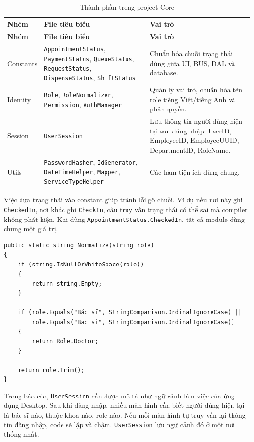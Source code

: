 \documentclass[12pt,a4paper]{article}
\numberwithin{figure}{subsection}
\numberwithin{table}{subsection}
\newcounter{codecounter}
\newenvironment{codeblock}[2]{%
    \refstepcounter{codecounter}%
    \phantomsection%
    \label{#1}%
    \par\smallskip
}{%
    \par\smallskip
}
\begin{document}
\begin{longtable}{|p{4cm}|p{4.8cm}|p{5cm}|}
\caption{Thành phần trong project Core} \\
\hline
\textbf{Nhóm} & \textbf{File tiêu biểu} & \textbf{Vai trò} \\
\hline
\endfirsthead
\hline
\textbf{Nhóm} & \textbf{File tiêu biểu} & \textbf{Vai trò} \\
\hline
\endhead
Constants & \texttt{AppointmentStatus}, \texttt{PaymentStatus}, \texttt{QueueStatus}, \texttt{RequestStatus}, \texttt{DispenseStatus}, \texttt{ShiftStatus} & Chuẩn hóa chuỗi trạng thái dùng giữa UI, BUS, DAL và database. \\
\hline
Identity & \texttt{Role}, \texttt{RoleNormalizer}, \texttt{Permission}, \texttt{AuthManager} & Quản lý vai trò, chuẩn hóa tên role tiếng Việt/tiếng Anh và phân quyền. \\
\hline
Session & \texttt{UserSession} & Lưu thông tin người dùng hiện tại sau đăng nhập: UserID, EmployeeID, EmployeeUUID, DepartmentID, RoleName. \\
\hline
Utils & \texttt{PasswordHasher}, \texttt{IdGenerator}, \texttt{DateTimeHelper}, \texttt{Mapper}, \texttt{ServiceTypeHelper} & Các hàm tiện ích dùng chung. \\
\hline
\end{longtable}

Việc đưa trạng thái vào constant giúp tránh lỗi gõ chuỗi. Ví dụ nếu nơi này ghi \texttt{CheckedIn}, nơi khác ghi \texttt{CheckIn}, câu truy vấn trạng thái có thể sai mà compiler không phát hiện. Khi dùng \texttt{AppointmentStatus.CheckedIn}, tất cả module dùng chung một giá trị.

\begin{codeblock}{code:role-normalizer}{Chuẩn hóa vai trò người dùng}
\begin{verbatim}
public static string Normalize(string role)
{
    if (string.IsNullOrWhiteSpace(role))
    {
        return string.Empty;
    }

    if (role.Equals("Bác sĩ", StringComparison.OrdinalIgnoreCase) ||
        role.Equals("Bac si", StringComparison.OrdinalIgnoreCase))
    {
        return Role.Doctor;
    }

    return role.Trim();
}
\end{verbatim}
\end{codeblock}

Trong báo cáo, \texttt{UserSession} cần được mô tả như ngữ cảnh làm việc của ứng dụng Desktop. Sau khi đăng nhập, nhiều màn hình cần biết người dùng hiện tại là bác sĩ nào, thuộc khoa nào, role nào. Nếu mỗi màn hình tự truy vấn lại thông tin đăng nhập, code sẽ lặp và chậm. \texttt{UserSession} lưu ngữ cảnh đó ở một nơi thống nhất.
\end{document}
